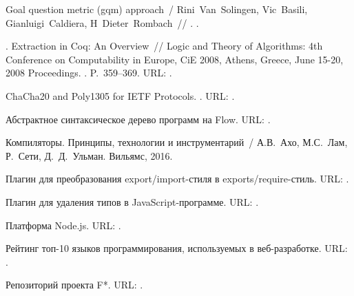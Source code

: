 \begin{thebibliography}{10}
Goal question metric (gqm) approach~/ Rini~Van~Solingen, Vic~Basili,
  Gianluigi~Caldiera, H~Dieter~Rombach~// . \BibDash
{}.

. Extraction in Coq: An Overview~// Logic and Theory
  of Algorithms: 4th Conference on Computability in Europe, CiE 2008, Athens,
  Greece, June 15-20, 2008 Proceedings. \BibDash
{}. \BibDash
\newblock P.~359--369. \BibDash
\newblock URL: .

 ChaCha20 and Poly1305 for IETF Protocols. \BibDash
{}. \BibDash
\newblock URL: .

Абстрактное синтаксическое дерево
  программ на Flow. \BibDash
\newblock URL:
  .

Компиляторы. Принципы, технологии и
  инструментарий~/ А.В.~Ахо, М.С.~Лам, Р.~Сети,
  Д.~Д.~Ульман. \BibDash
\newblock Вильямс, 2016.

Плагин для преобразования export/import-стиля в
  exports/require-стиль. \BibDash
\newblock URL:
  .

Плагин для удаления типов в
  JavaScript-программе. \BibDash
\newblock URL:
  .

Платформа Node.js. \BibDash
\newblock URL: .

Рейтинг топ-10 языков программирования,
  используемых в веб-разработке. \BibDash
\newblock URL:
  .

Репозиторий проекта F*. \BibDash
\newblock URL: .


\end{thebibliography}
